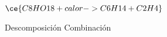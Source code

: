 $\ce{C8HO18  +  calor -> C6H14 + C2H4}$
\begin{oneparchoices}
    \CorrectChoice Descomposición
    \choice Combinación
\end{oneparchoices}